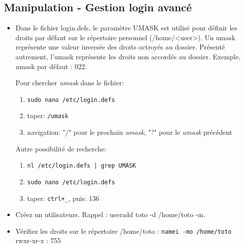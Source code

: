 \documentclass[a4paper]{article}
\begin{document}
\subsection{Manipulation - Gestion login avancé}





\begin{itemize}

\item Dans le fichier login.defs, le paramètre UMASK est utilisé pour définir les droits par défaut sur le répertoire personnel (/home/<user>). Un umask représente une valeur inversée des droits octroyés au dossier. Présenté autrement, l’umask représente les droits non accordés au dossier. Exemple, umask par défaut : 022.
\begin{example}
    Pour chercher \textit{umask} dans le fichier:
    \begin{enumerate}
        \item \texttt{sudo nano /etc/login.defs}
        \item taper: \texttt{/umask}
        \item navigation: "/" pour le prochain \textit{umask}, "?" pour le \textit{umask} précédent
    \end{enumerate}
    Autre possibilité de recherche:
    \begin{enumerate}
        \item \texttt{nl /etc/login.defs | grep UMASK}
        \item \texttt{sudo nano /etc/login.defs}
        \item taper: \texttt{ctrl+\_}, puis: 136
    \end{enumerate}
\end{example}

\item Créez un utilisateurs. Rappel : useradd toto -d /home/toto -m.

\item Vérifiez les droits sur le répertoire /home/toto : \texttt{namei -mo /home/toto} \\
rwxr-xr-x : 755


\end{itemize}
\end{document}

